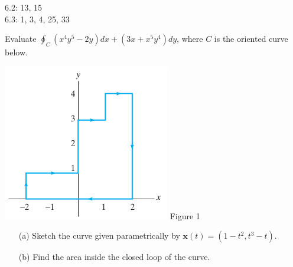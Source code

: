 \documentclass[11pt,letterpaper,boxed]{pset}
\begin{document}
    \begin{center}
    	6.2: 13, 15 \\
        6.3: 1, 3, 4, 25, 33
    \end{center}
    
    \begin{problem} [6.2.13]
	    
	    Evaluate $\oint_C (x^4y^5 - 2y) dx + (3x + x^5y^4)dy$, where $C$ is the oriented curve below.

    \end{problem}
    
	\begin{minipage}[!h]{0.5\textwidth}
		\includegraphics[width=\textwidth]{curve.png}
		Figure 1
	\end{minipage}
    \newpage
    
    
    \begin{problem} [6.2.15]
        \begin{enumerate}
            \item [(a)] Sketch the curve given parametrically by $\textbf{x}(t) = (1 - t^2, t^3 - t)$.
            \item [(b)] Find the area inside the closed loop of the curve.
        \end{enumerate}
    \end{problem}
    \newpage
    
\end{document}
